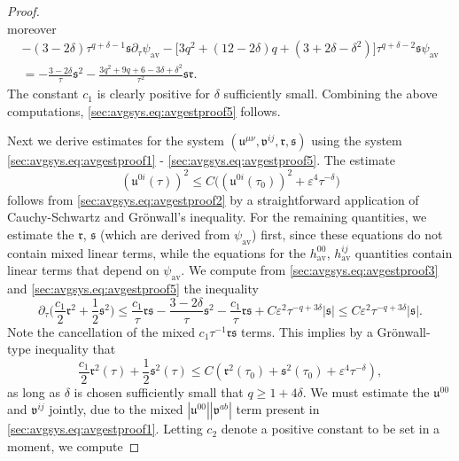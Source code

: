 \documentclass[10pt,a4paper]{amsart}
\newcommand{\av}{\mathrm{av}}
\newcommand{\mf}{\mathfrak}
\newcommand{\pa}{\partial}
\newcommand{\ve}{\varepsilon}
\begin{document}
\begin{proof}
\begin{equation}
    \end{equation}
    moreover
    \begin{multline}
        -(3-2\delta)\tau^{q+\delta-1}\mf{s}\pa_\tau \psi_{\av} - \Big[3q^2+(12-2\delta)q+(3+2\delta-\delta^2)\Big]\tau^{q+\delta-2}\mf{s}\psi_{\av}\\
        = - \frac{3-2\delta}{\tau}\mf{s}^2 - \frac{3q^2+9q+6-3\delta+\delta^2}{\tau^2}\mf{s}\mf{r}.
    \end{multline}
    The constant $c_1$ is clearly positive for $\delta$ sufficiently small. Combining the above computations, \eqref{sec:avgsys.eq:avgestproof5} follows.
    
    Next we derive estimates for the system $(\mf{u}^{\mu\nu}, \mf{v}^{ij}, \mf{r},\mf{s})$ using the system \eqref{sec:avgsys.eq:avgestproof1} - \eqref{sec:avgsys.eq:avgestproof5}. The estimate
    \begin{equation}\label{sec:avgsys.eq:avgestproof7}
     (\mf{u}^{0i}(\tau))^2 \leq C\big((\mf{u}^{0i}(\tau_0))^2 + \ve^4\tau^{-\delta}\big)
    \end{equation}
    follows from \eqref{sec:avgsys.eq:avgestproof2} by a straightforward application of Cauchy-Schwartz and Gr\"onwall's inequality. For the remaining quantities, we estimate the $\mf{r}$, $\mf{s}$ (which are derived from $\psi_{\av}$) first, since these equations do not contain mixed linear terms, while the equations for the $h_{\av}^{00}$, $h_{\av}^{ij}$ quantities contain linear terms that depend on $\psi_{\av}$. We compute from \eqref{sec:avgsys.eq:avgestproof3} and \eqref{sec:avgsys.eq:avgestproof5} the inequality
    \begin{equation}
        \pa_\tau\big(\frac{c_1}{2}\mf{r}^2 + \frac{1}{2}\mf{s}^2\big) \leq \frac{c_1}{\tau}\mf{r}\mf{s} -\frac{3-2\delta}{\tau}\mf{s}^2 - \frac{c_1}{\tau}\mf{r}\mf{s} + C\ve^2 \tau^{-q + 3\delta}|\mf{s}| \leq C\ve^2\tau^{-q+3\delta}|\mf{s}|.
    \end{equation}
    Note the cancellation of the mixed $c_1\tau^{-1}\mf{r}\mf{s}$ terms. This implies by a Gr\"onwall-type inequality that
    \begin{equation}\label{sec:avgsys.eq:avgestproof8}
        \frac{c_1}{2}\mf{r}^2(\tau) + \frac{1}{2}\mf{s}^2(\tau) \leq C(\mf{r}^2(\tau_0) + \mf{s}^2(\tau_0) + \ve^4 \tau^{-\delta}),
    \end{equation}
    as long as $\delta$ is chosen sufficiently small that $q \geq 1+4\delta$. We must estimate the $\mf{u}^{00}$ and $\mf{v}^{ij}$ jointly, due to the mixed $|\mf{u}^{00}||\mf{v}^{ab}|$ term present in \eqref{sec:avgsys.eq:avgestproof1}. Letting $c_2$ denote a positive constant to be set in a moment, we compute

\end{proof}
\end{document}
